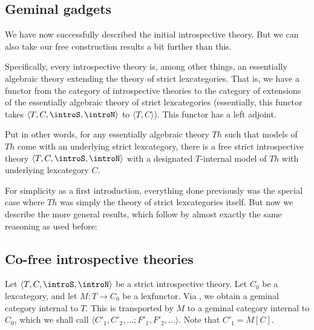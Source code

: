 \subsection{Geminal gadgets}
We have now successfully described the initial introspective theory. But we can also take our free construction results a bit further than this.

Specifically, every introspective theory is, among other things, an essentially algebraic theory extending the theory of strict lexcategories. That is, we have a functor from the category of introspective theories to the category of extensions of the essentially algebraic theory of strict lexcategories (essentially, this functor takes $\langle T, C, \introS, \introN \rangle$ to $\langle T, C \rangle$). This functor has a left adjoint.

Put in other words, for any essentially algebraic theory $Th$ such that models of $Th$ come with an underlying strict lexcategory, there is a free strict introspective theory $\langle T, C, \introS, \introN \rangle$ with a designated $T$-internal model of $Th$ with underlying lexcategory $C$.

For simplicity as a first introduction, everything done previously was the special case where $Th$ was simply the theory of strict lexcategories itself. But now we describe the more general results, which follow by almost exactly the same reasoning as used before:


\subsection{Co-free introspective theories}

Let $\langle T, C, \introS, \introN \rangle$ be a strict introspective theory. Let $C_0$ be a lexcategory, and let $M : T \to C_0$ be a lexfunctor. Via , we obtain a geminal category internal to $T$. This is transported by $M$ to a geminal category internal to $C_0$, which we shall call $\langle C'_1, C'_2, \ldots; F'_1, F'_2, \ldots \rangle$. Note that $C'_1 = M[C]$.

